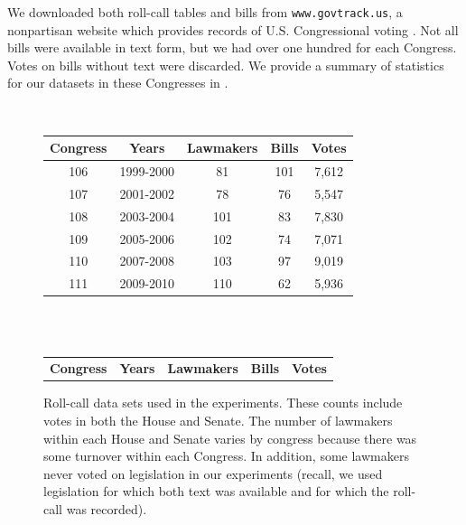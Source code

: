 We downloaded both roll-call tables and bills from
\verb!www.govtrack.us!, a nonpartisan website
which provides records of U.S. Congressional voting \citep{govtrack:2009}.  Not all bills
were available in text form, but we had over one hundred for each
Congress.  Votes on bills without text were discarded.  We provide a
summary of statistics for our datasets in these Congresses in
.

\begin{figure}
  \center
  \caption{Roll-call data sets used in the experiments.  These counts
    include votes in both the House and Senate.  The number of lawmakers within
    each House and Senate varies by congress because there was some
    turnover within each Congress.  In addition, some lawmakers never
    voted on legislation in our experiments (recall, we used
    legislation for which both text was available and for which the
    roll-call was recorded).}
  \begin{small}
   \\
  \begin{tabular}{ccccc}
    \hline
    \hline
    \hspace{-8pt} \textbf{Congress} \hspace{-8pt} & \hspace{-8pt} {\textbf{Years}} \hspace{-8pt} & \textbf{Lawmakers} \hspace{-8pt} & \hspace{-4pt} \textbf{Bills} \hspace{-4pt} & \hspace{-4pt} \textbf{Votes} \\
    \hline
    106 & 1999-2000 & 81 & 101 & 7,612 \\
    107 & 2001-2002 & 78 & 76 & 5,547 \\
    108 & 2003-2004 & 101 & 83 & 7,830 \\
    109 & 2005-2006 & 102 & 74 & 7,071 \\
    110 & 2007-2008 & 103 & 97 & 9,019 \\
    111 & 2009-2010 & 110 & 62 & 5,936 \\
    \hline
  \end{tabular}
  \\
     \\
  \begin{tabular}{ccccc}
    \hline
    \hline
    \hspace{-8pt} \textbf{Congress} \hspace{-8pt} & \hspace{-8pt} {\textbf{Years}} \hspace{-8pt} & \textbf{Lawmakers} \hspace{-8pt} & \hspace{-4pt} \textbf{Bills} \hspace{-4pt} & \hspace{-4pt} \textbf{Votes} \\

\end{tabular}
\end{small}
\end{figure}
